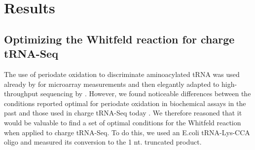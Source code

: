 \documentclass[9pt,lineno]{elife}
\begin{document}
\begin{figure}[ht!]
\label{figsupp:f1S1}
\end{figure}




\section{Results}
\subsection{Optimizing the Whitfeld reaction for charge tRNA-Seq}
The use of periodate oxidation to discriminate aminoacylated tRNA was used already by \cite{Dittmar2005-va} for microarray measurements and then elegantly adapted to high-throughput sequencing by \cite{Evans2017-st}.
However, we found noticeable differences between the conditions reported optimal for periodate oxidation in biochemical assays in the past \citep{Khym1961-xf, Neu1964-hu, Khym1968-ac, Dyer1956-zh} and those used in charge tRNA-Seq today \citep{Evans2017-st, Behrens2021-gb, Watkins2022-er, Pavlova2020-aj, Tsukamoto2022-rc}.
We therefore reasoned that it would be valuable to find a set of optimal conditions for the Whitfeld reaction when applied to charge tRNA-Seq.
To do this, we used an E.coli tRNA-Lys-CCA oligo and measured its conversion to the 1 nt. truncated product.
\end{document}
